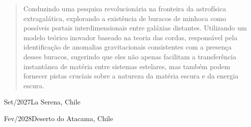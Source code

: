 \documentclass[10pt,a4paper,ragged2e,withhyper,darkmode, normalphoto]{altacv}
\begin{document}
\begin{paracol}{2}
            \begin{quote}
                Conduzindo uma pesquisa revolucionária na fronteira da astrofísica extragalática, explorando a existência de buracos de minhoca como possíveis portais interdimensionais entre galáxias distantes. Utilizando um modelo teórico inovador baseado na teoria das cordas, responsável pela identificação de anomalias gravitacionais consistentes com a presença desses buracos, sugerindo que eles não apenas facilitam a transferência instantânea de matéria entre sistemas estelares, mas também podem fornecer pistas cruciais sobre a natureza da matéria escura e da energia escura.
            \end{quote}
        
            \divider
            
            \divider

            \divider

        
            \divider
            
             {Set/2027}{La Serena, Chile}
            \divider
            
             {Fev/2028}{Deserto do Atacama, Chile}
        
    \end{paracol}
\end{document}
